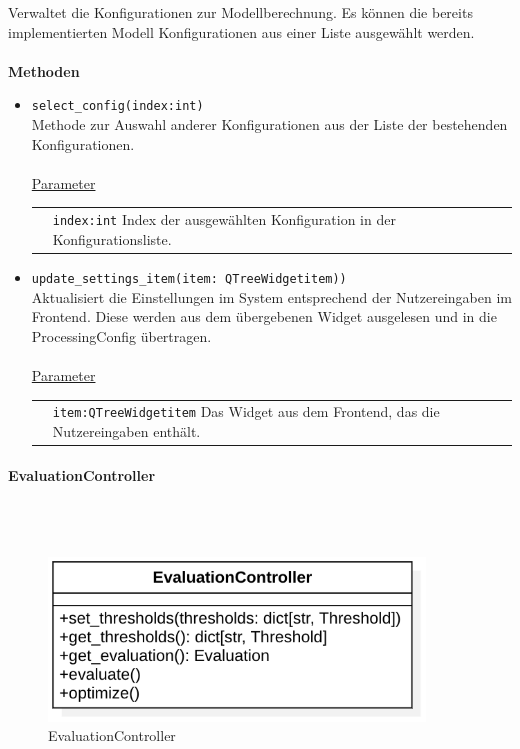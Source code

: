 \documentclass{article}
\newcommand{\classheader}[2][]{\paragraph{#2}
\mbox{}\textit{#1}\\\\}
\begin{document}
Verwaltet die Konfigurationen zur Modellberechnung. Es können die bereits implementierten Modell Konfigurationen aus einer Liste ausgewählt werden. \\\\
\textbf{\large{Methoden}}
\begin{itemize}
\item \texttt{select\_config(index:int)}\\ Methode zur Auswahl anderer Konfigurationen aus der Liste der bestehenden Konfigurationen.\\\\
\underline{{Parameter}}\\
\begin{tabular}{lp{10.7cm}}
 & \texttt{index:int} Index der ausgewählten Konfiguration in der Konfigurationsliste. \\
\end{tabular}
\item \texttt{update\_settings\_item(item: QTreeWidgetitem))}\\ Aktualisiert die Einstellungen im System entsprechend der Nutzereingaben im Frontend. Diese werden aus dem übergebenen Widget ausgelesen und in die ProcessingConfig übertragen.\\\\
\underline{{Parameter}}\\
\begin{tabular}{lp{10.7cm}}
 & \texttt{item:QTreeWidgetitem} Das Widget aus dem Frontend, das die Nutzereingaben enthält. \\
\end{tabular}
\end{itemize}


\newpage
\classheader{EvaluationController}\label{cls:EvaluationController}

\begin{figure}[H]%
    \centering
    \includegraphics[width=10cm]{entwurf/Floriane/EvaluationController.png}
    \caption{EvaluationController}
\end{figure}
\end{document}
